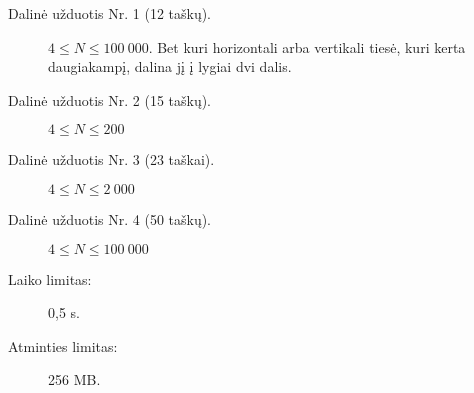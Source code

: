 \documentclass{boi2014-lt}
\begin{document}
    \begin{description}
        \item[Dalinė užduotis Nr. 1 (12 taškų).] $4 \le N \le 100\ 000$.
            Bet kuri horizontali arba vertikali tiesė, kuri kerta daugiakampį,
            dalina jį į lygiai dvi dalis.
        \item[Dalinė užduotis Nr. 2 (15 taškų).] $4 \le N \le 200$
        \item[Dalinė užduotis Nr. 3 (23 taškai).] $4 \le N \le 2\ 000$
        \item[Dalinė užduotis Nr. 4 (50 taškų).] $4 \le N \le 100\ 000$
    \end{description}

    \Constraints

    \begin{description}
        \item[Laiko limitas:] 0,5 s.
        \item[Atminties limitas:] 256 MB.
    \end{description}
\end{document}
